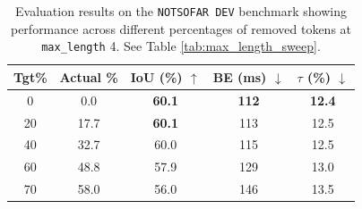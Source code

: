 \begin{table}[htbp]
\centering
\caption{Evaluation results on the \texttt{NOTSOFAR DEV} benchmark showing performance across different percentages of removed tokens at \texttt{max\_length} 4. See Table \ref{tab:max_length_sweep}.}
\label{tab:notsofar_dev_removed}
\begin{tabular}{ccccc}
\toprule
\textbf{Tgt\%} & \textbf{Actual \%} & \textbf{IoU (\%)} $\uparrow$ & \textbf{BE (ms)} $\downarrow$ & \textbf{$\tau$} (\%) $\downarrow$ \\
\midrule
0  & 0.0  & \textbf{60.1} & \textbf{112} & \textbf{12.4} \\
20 & 17.7 & \textbf{60.1} & 113          & 12.5          \\
40 & 32.7 & 60.0          & 115          & 12.5          \\
60 & 48.8 & 57.9          & 129          & 13.0          \\
70 & 58.0 & 56.0          & 146          & 13.5          \\
\bottomrule
\end{tabular}
\end{table}